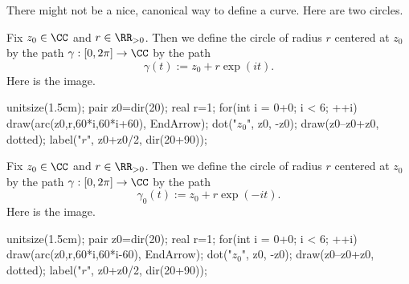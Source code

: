 There might not be a nice, canonical way to define a curve. Here are two circles.
\begin{example}
	Fix $z_0\in\CC$ and $r\in\RR_{>0}$. Then we define the circle of radius $r$ centered at $z_0$ by the path $\gamma:[0,2\pi]\to\CC$ by the path
	\[\gamma(t):=z_0+r\exp(it).\]
	Here is the image.
	\begin{center}
		\begin{asy}
			unitsize(1.5cm);
			pair z0=dir(20);
			real r=1;
			for(int i = 0+0; i < 6; ++i)
				draw(arc(z0,r,60*i,60*i+60), EndArrow);
			dot("$z_0$", z0, -z0);
			draw(z0--z0+z0, dotted);
			label("$r$", z0+z0/2, dir(20+90));
		\end{asy}
	\end{center}
\end{example}
\begin{example}
	Fix $z_0\in\CC$ and $r\in\RR_{>0}$. Then we define the circle of radius $r$ centered at $z_0$ by the path $\gamma:[0,2\pi]\to\CC$ by the path
	\[\gamma_0(t):=z_0+r\exp(-it).\]
	Here is the image.
	\begin{center}
		\begin{asy}
			unitsize(1.5cm);
			pair z0=dir(20);
			real r=1;
			for(int i = 0+0; i < 6; ++i)
				draw(arc(z0,r,60*i,60*i-60), EndArrow);
			dot("$z_0$", z0, -z0);
			draw(z0--z0+z0, dotted);
			label("$r$", z0+z0/2, dir(20+90));
		\end{asy}
	\end{center}
\end{example}

